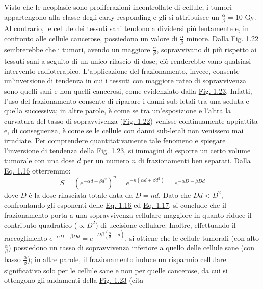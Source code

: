 \documentclass[12pt,a4paper,twoside]{report}
\begin{document}
	Visto che le neoplasie sono proliferazioni incontrollate di cellule, i tumori appartengono alla classe degli early responding e gli si attribuisce un $\frac{\alpha}{\beta}=10\mbox{ Gy}$. Al contrario, le cellule dei tessuti sani tendono a dividersi più lentamente e, in confronto alle cellule cancerose, possiedono un valore di $\frac{\alpha}{\beta}$ minore. Dalla \hyperref[fig:survival_cell]{Fig. 1.22} sembrerebbe che i tumori, avendo un maggiore $\frac{\alpha}{\beta}$, sopravvivano di più rispetto ai tessuti sani a seguito di un unico rilascio di dose; ciò renderebbe vano qualsiasi intervento radioterapico. L'applicazione del frazionamento, invece, consente un'inversione di tendenza in cui i tessuti con maggiore rateo di sopravvivenza sono quelli sani e non quelli cancerosi, come evidenziato dalla \hyperref[fig:sparing]{Fig. 1.23}. Infatti, l'uso del frazionamento consente di riparare i danni sub-letali tra una seduta e quella successiva; in altre parole, è come se tra un'esposizione e l'altra la curvatura del tasso di sopravvivenza (\hyperref[fig:survival_cell]{Fig. 1.22}) venisse continuamente appiattita e, di conseguenza, è come se le cellule con danni sub-letali non venissero mai irradiate. Per comprendere quantitativamente tale fenomeno e spiegare l'inversione di tendenza della \hyperref[fig:sparing]{Fig. 1.23}, si immagini di esporre un certo volume tumorale con una dose $d$ per un numero $n$ di frazionamenti ben separati. Dalla \hyperref[eq:survival2]{Eq. 1.16} otterremmo:
	\begin{equation}
		S=\left(e^{-\alpha d-\beta d^2}\right)^n=e^{-n\left(\alpha d+\beta d^2\right)}=e^{-\alpha D-\beta Dd}
		\label{eq:survival3}
	\end{equation}
	dove $D$ è la dose rilasciata totale data da $D=nd$. Dato che $Dd<D^2$, confrontando gli esponenti delle \hyperref[eq:survival2]{Eq. 1.16} ed \hyperref[eq:survival3]{Eq. 1.17}, si conclude che il frazionamento porta a una sopravvivenza cellulare maggiore in quanto riduce il contributo quadratico ($\propto D^2$) di uccisione cellulare. Inoltre, effettuando il raccoglimento $e^{-\alpha D-\beta Dd}=e^{-D\beta\left(\frac{\alpha}{\beta}-d\right)}$, si ottiene che le cellule tumorali (con alto $\frac{\alpha}{\beta}$) possiedono un tasso di sopravvivenza inferiore a quello delle cellule sane (con basso $\frac{\alpha}{\beta}$); in altre parole, il frazionamento induce un risparmio cellulare significativo solo per le cellule sane e non per quelle cancerose, da cui si ottengono gli andamenti della \hyperref[fig:sparing]{Fig. 1.23} (cita
\end{document}
